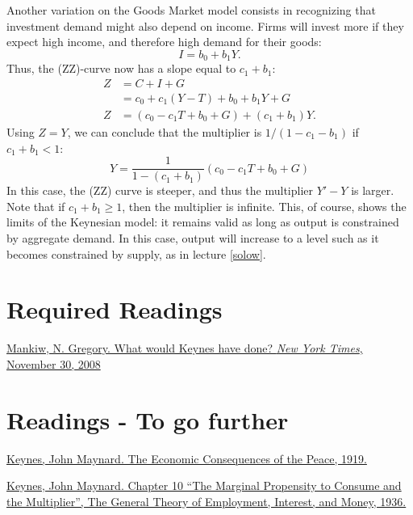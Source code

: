 \documentclass[]{book}
\theoremstyle{definition}
\theoremstyle{definition}
\theoremstyle{definition}
\theoremstyle{remark}
\begin{document}
Another variation on the Goods Market model consists in recognizing that
investment demand might also depend on income. Firms will invest more if
they expect high income, and therefore high demand for their goods:
\[I=b_{0}+b_{1}Y.\] Thus, the (ZZ)-curve now has a slope equal to
\(c_1+b_1\): \[
\begin{aligned}
Z   &=C+I+G\\
    &=c_{0}+c_{1}\left(Y-T\right)+b_{0}+b_{1}Y+G\\
Z   &=\left(c_{0}-c_{1}T+b_{0}+G\right)+\left(c_{1}+b_{1}\right)Y.
\end{aligned}
\] Using \(Z=Y\), we can conclude that the multiplier is
\(1/(1-c_1-b_1)\) if \(c_{1}+b_{1}<1\):
\[Y=\frac{1}{1-\left(c_{1}+b_{1}\right)}\left(c_{0}-c_{1}T+b_{0}+G\right)\]
In this case, the (ZZ) curve is steeper, and thus the multiplier
\(Y'-Y\) is larger. Note that if \(c_{1}+b_{1}\geq1\), then the
multiplier is infinite. This, of course, shows the limits of the
Keynesian model: it remains valid as long as output is constrained by
aggregate demand. In this case, output will increase to a level such as
it becomes constrained by supply, as in lecture \ref{solow}.

\section*{Required Readings}\label{required-readings}

\href{https://search.proquest.com/docview/433963341/fulltext/43832006CCFE4D96PQ/1?accountid=14512}{Mankiw,
N. Gregory. What would Keynes have done? \emph{New York Times}, November
30, 2008}

\section*{Readings - To go further}\label{readings---to-go-further-6}

\href{https://socialsciences.mcmaster.ca/econ/ugcm/3ll3/keynes/pdf\%26filename\%3Dpeace3.pdf}{Keynes,
John Maynard. The Economic Consequences of the Peace, 1919.}

\href{https://cas2.umkc.edu/economics/people/facultypages/kregel/courses/econ645/winter2011/generaltheory.pdf}{Keynes,
John Maynard. Chapter 10 ``The Marginal Propensity to Consume and the
Multiplier'', The General Theory of Employment, Interest, and Money,
1936.}
\end{document}
